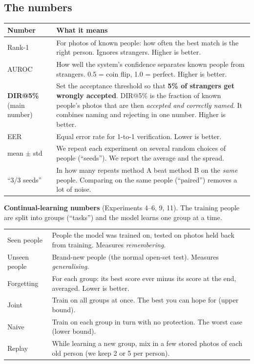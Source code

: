 \documentclass[11pt,a4paper]{article}
\begin{document}
\subsection{The numbers}
\begin{center}
\begin{tabularx}{\textwidth}{@{}L{3.2cm}X@{}}
\toprule
\textbf{Number} & \textbf{What it means}\\
\midrule
Rank-1 & For photos of known people: how often the best match is the right person. Ignores strangers. Higher is better.\\
AUROC & How well the system's confidence separates known people from strangers. 0.5 = coin flip, 1.0 = perfect. Higher is better.\\
\textbf{DIR@5\%} (main number) & Set the acceptance threshold so that \textbf{5\% of strangers get wrongly accepted}. DIR@5\% is the fraction of known people's photos that are then \emph{accepted and correctly named}. It combines naming and rejecting in one number. Higher is better.\\
EER & Equal error rate for 1-to-1 verification. Lower is better.\\
mean $\pm$ std & We repeat each experiment on several random choices of people (``seeds''). We report the average and the spread.\\
``3/3 seeds'' & In how many repeats method A beat method B on the \emph{same} people. Comparing on the same people (``paired'') removes a lot of noise.\\
\bottomrule
\end{tabularx}
\end{center}

\textbf{Continual-learning numbers} (Experiments 4--6, 9, 11). The training people are split into groups (``tasks'') and the model learns one group at a time.
\begin{center}
\begin{tabularx}{\textwidth}{@{}L{3.2cm}X@{}}
\toprule
Seen people & People the model was trained on, tested on photos held back from training. Measures \emph{remembering}.\\
Unseen people & Brand-new people (the normal open-set test). Measures \emph{generalising}.\\
Forgetting & For each group: its best score ever minus its score at the end, averaged. Lower is better.\\
Joint & Train on all groups at once. The best you can hope for (upper bound).\\
Naive & Train on each group in turn with no protection. The worst case (lower bound).\\
Replay & While learning a new group, mix in a few stored photos of each old person (we keep 2 or 5 per person).\\
\bottomrule
\end{tabularx}
\end{center}
\end{document}
